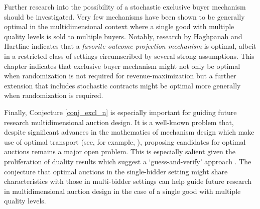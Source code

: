 Further research into the possibility of a stochastic exclusive buyer mechanism should be investigated. Very few mechanisms have been shown to be generally optimal in the multidimensional context where a single good with multiple quality levels is sold to multiple buyers. Notably, research by Haghpanah and Hartline \autocite*[Theorem 9]{haghpanah2014} indicates that a \textit{favorite-outcome projection mechanism} is optimal, albeit in a restricted class of settings circumscribed by several strong assumptions. This chapter indicates that exclusive buyer mechanism might not only be optimal when randomization is not required for revenue-maximization but a further extension that includes stochastic contracts might be optimal more generally when randomization is required.

Finally, Conjecture \ref{conj_excl_n} is especially important for guiding future research multidimensional auction design. It is a well-known problem that, despite significant advances in the mathematics of mechanism design which make use of optimal transport (see, for example, \cite{ekeland2010}), proposing candidates for optimal auctions remains a major open problem. This is especially salient given the proliferation of duality results which suggest a `guess-and-verify' approach \autocite{daskalakis2017strong,kolesnikov2022}. The conjecture that optimal auctions in the single-bidder setting might share characteristics with those in multi-bidder settings can help guide future research in multidimensional auction design in the case of a single good with multiple quality levels.












